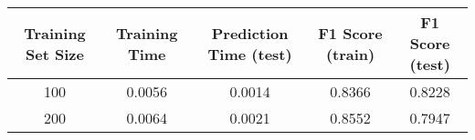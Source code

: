 \documentclass{ctexart}
\begin{document}
\begin{longtable}[]{@{}ccccc@{}}
\toprule
\begin{minipage}[b]{0.16\columnwidth}\centering\strut
Training Set Size\strut
\end{minipage} & \begin{minipage}[b]{0.21\columnwidth}\centering\strut
Training Time\strut
\end{minipage} & \begin{minipage}[b]{0.20\columnwidth}\centering\strut
Prediction Time (test)\strut
\end{minipage} & \begin{minipage}[b]{0.15\columnwidth}\centering\strut
F1 Score (train)\strut
\end{minipage} & \begin{minipage}[b]{0.14\columnwidth}\centering\strut
F1 Score (test)\strut
\end{minipage}\tabularnewline
\midrule
\endhead
\begin{minipage}[t]{0.16\columnwidth}\centering\strut
100\strut
\end{minipage} & \begin{minipage}[t]{0.21\columnwidth}\centering\strut
0.0056\strut
\end{minipage} & \begin{minipage}[t]{0.20\columnwidth}\centering\strut
0.0014\strut
\end{minipage} & \begin{minipage}[t]{0.15\columnwidth}\centering\strut
0.8366\strut
\end{minipage} & \begin{minipage}[t]{0.14\columnwidth}\centering\strut
0.8228\strut
\end{minipage}\tabularnewline
\begin{minipage}[t]{0.16\columnwidth}\centering\strut
200\strut
\end{minipage} & \begin{minipage}[t]{0.21\columnwidth}\centering\strut
0.0064\strut
\end{minipage} & \begin{minipage}[t]{0.20\columnwidth}\centering\strut
0.0021\strut
\end{minipage} & \begin{minipage}[t]{0.15\columnwidth}\centering\strut
0.8552\strut
\end{minipage} & \begin{minipage}[t]{0.14\columnwidth}\centering\strut
0.7947\strut
\end{minipage}\tabularnewline

\end{longtable}
\end{document}
